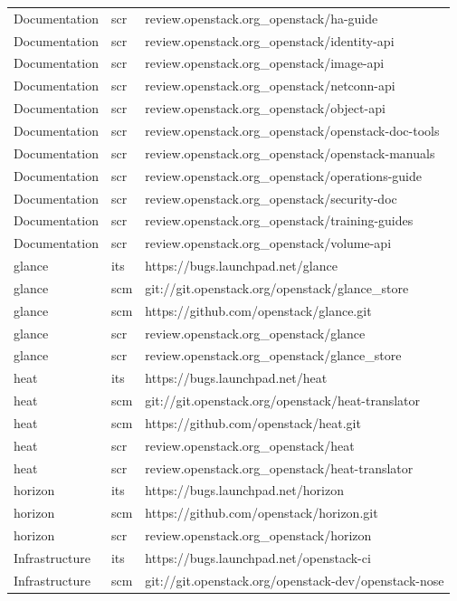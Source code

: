 \begin{center}
\begin{longtable}{|p{4cm}|p{1cm}|p{10cm}|}
Documentation&scr&review.openstack.org\_openstack/ha-guide\\ 
Documentation&scr&review.openstack.org\_openstack/identity-api\\ 
Documentation&scr&review.openstack.org\_openstack/image-api\\ 
Documentation&scr&review.openstack.org\_openstack/netconn-api\\ 
Documentation&scr&review.openstack.org\_openstack/object-api\\ 
Documentation&scr&review.openstack.org\_openstack/openstack-doc-tools\\ 
Documentation&scr&review.openstack.org\_openstack/openstack-manuals\\ 
Documentation&scr&review.openstack.org\_openstack/operations-guide\\ 
Documentation&scr&review.openstack.org\_openstack/security-doc\\ 
Documentation&scr&review.openstack.org\_openstack/training-guides\\ 
Documentation&scr&review.openstack.org\_openstack/volume-api\\ 
glance&its&https://bugs.launchpad.net/glance\\ 
glance&scm&git://git.openstack.org/openstack/glance\_store\\ 
glance&scm&https://github.com/openstack/glance.git\\ 
glance&scr&review.openstack.org\_openstack/glance\\ 
glance&scr&review.openstack.org\_openstack/glance\_store\\ 
heat&its&https://bugs.launchpad.net/heat\\ 
heat&scm&git://git.openstack.org/openstack/heat-translator\\ 
heat&scm&https://github.com/openstack/heat.git\\ 
heat&scr&review.openstack.org\_openstack/heat\\ 
heat&scr&review.openstack.org\_openstack/heat-translator\\ 
horizon&its&https://bugs.launchpad.net/horizon\\ 
horizon&scm&https://github.com/openstack/horizon.git\\ 
horizon&scr&review.openstack.org\_openstack/horizon\\ 
Infrastructure&its&https://bugs.launchpad.net/openstack-ci\\ 
Infrastructure&scm&git://git.openstack.org/openstack-dev/openstack-nose\\ 

\end{longtable}
\end{center}

